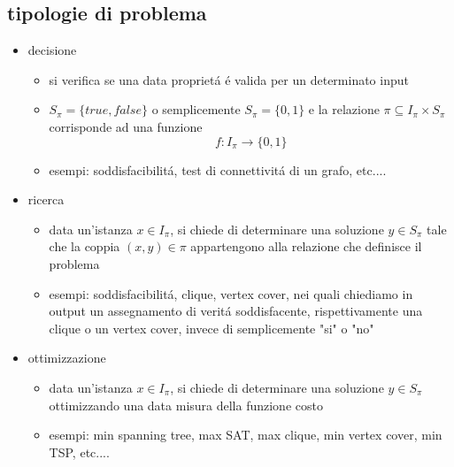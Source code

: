 \subsection*{\color{cyan} tipologie di problema}
\begin{itemize}
	\item decisione
		\begin{itemize}
			\item si verifica se una data propriet\'a \'e valida per un determinato input
			\item $S_{\pi}=\{true,false\}$ o semplicemente $S_{\pi}=\{0,1\}$ e la relazione $\pi\subseteq I_{\pi}\times S_{\pi}$ corrisponde ad una funzione $$f:I_{\pi}\rightarrow\{0,1\}$$ 
			\item esempi: soddisfacibilit\'a, test di connettivit\'a di un grafo, etc....
		\end{itemize}
	\item ricerca
	\begin{itemize}
		\item data un'istanza $x\in I_{\pi}$, si chiede di determinare una soluzione $y\in S_{\pi}$ tale che la coppia $(x,y)\in\pi$ appartengono alla relazione che definisce il problema
		\item esempi: soddisfacibilit\'a, clique, vertex cover, nei quali chiediamo in output un assegnamento di verit\'a soddisfacente, rispettivamente una clique o un vertex cover, invece di semplicemente "si" o "no"
	\end{itemize}
	\item ottimizzazione
	\begin{itemize}
		\item data un'istanza $x\in I_{\pi}$, si chiede di determinare una soluzione $y\in S_{\pi}$ ottimizzando una data misura della funzione costo
		\item esempi: min spanning tree, max SAT, max clique, min vertex cover, min TSP, etc....
	\end{itemize}
\end{itemize}


